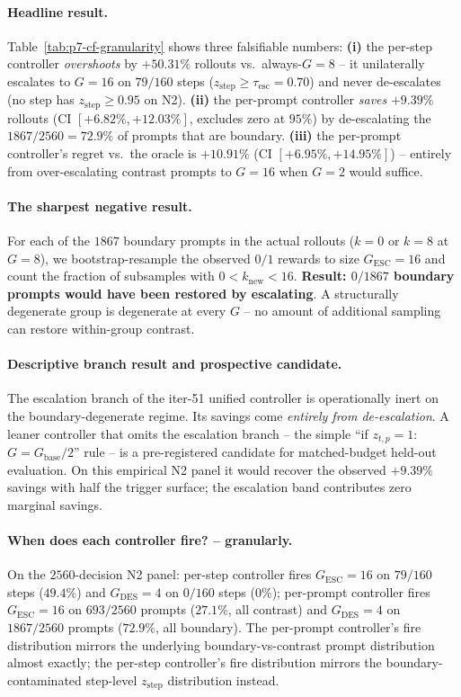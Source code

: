 \paragraph{Headline result.}
Table~\ref{tab:p7-cf-granularity} shows three falsifiable numbers:
\textbf{(i)} the per-step controller \emph{overshoots} by
$+50.31\%$ rollouts vs.\ always-$G{=}8$ -- it unilaterally
escalates to $G{=}16$ on $79/160$ steps ($z_{\mathrm{step}} \geq
\tau_{\mathrm{esc}}{=}0.70$) and never de-escalates (no step has
$z_{\mathrm{step}} \geq 0.95$ on N2). \textbf{(ii)} the per-prompt
controller \emph{saves} $+9.39\%$ rollouts
(CI $[+6.82\%, +12.03\%]$, excludes zero at $95\%$) by
de-escalating the $1867/2560 = 72.9\%$ of prompts that are boundary.
\textbf{(iii)} the per-prompt controller's regret vs.\ the oracle
is $+10.91\%$ (CI $[+6.95\%, +14.95\%]$) -- entirely from
over-escalating contrast prompts to $G{=}16$ when $G{=}2$ would
suffice.

\paragraph{The sharpest negative result.}
For each of the $1867$ boundary prompts in the actual rollouts
($k{=}0$ or $k{=}8$ at $G{=}8$), we bootstrap-resample the
observed $0/1$ rewards to size $G_{\mathrm{ESC}}{=}16$ and count
the fraction of subsamples with $0 < k_{\mathrm{new}} < 16$.
\textbf{Result: $0/1867$ boundary prompts would have been restored
by escalating}. A structurally degenerate group is degenerate at
every $G$ -- no amount of additional sampling can restore
within-group contrast.

\paragraph{Descriptive branch result and prospective candidate.}
The escalation branch of the iter-51 unified controller is
operationally inert on the boundary-degenerate regime. Its savings
come \emph{entirely from de-escalation}. A leaner controller that
omits the escalation branch -- the simple
``if $z_{t,p}=1$: $G = G_{\mathrm{base}}/2$'' rule -- is a
pre-registered candidate for matched-budget held-out evaluation. On this
empirical N2 panel it would recover the observed $+9.39\%$ savings with half
the trigger surface; the escalation band contributes zero marginal savings.

\paragraph{When does each controller fire? -- granularly.}
On the $2560$-decision N2 panel: per-step controller fires
$G_{\mathrm{ESC}}{=}16$ on $79/160$ steps ($49.4\%$) and
$G_{\mathrm{DES}}{=}4$ on $0/160$ steps ($0\%$); per-prompt
controller fires $G_{\mathrm{ESC}}{=}16$ on $693/2560$ prompts
($27.1\%$, all contrast) and $G_{\mathrm{DES}}{=}4$ on
$1867/2560$ prompts ($72.9\%$, all boundary). The per-prompt
controller's fire distribution mirrors the underlying
boundary-vs-contrast prompt distribution almost exactly; the
per-step controller's fire distribution mirrors the
boundary-contaminated step-level $z_{\mathrm{step}}$ distribution
instead.

